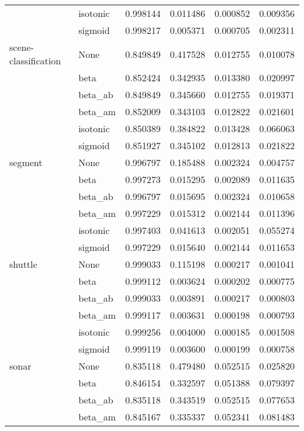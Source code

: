 \begin{tabular}{llrrrr}
        & isotonic &  0.998144 &  0.011486 &  0.000852 &  0.009356 \\
        & sigmoid &  0.998217 &  0.005371 &  0.000705 &  0.002311 \\
scene-classification & None &  0.849849 &  0.417528 &  0.012755 &  0.010078 \\
        & beta &  0.852424 &  0.342935 &  0.013380 &  0.020997 \\
        & beta\_ab &  0.849849 &  0.345660 &  0.012755 &  0.019371 \\
        & beta\_am &  0.852009 &  0.343103 &  0.012822 &  0.021601 \\
        & isotonic &  0.850389 &  0.384822 &  0.013428 &  0.066063 \\
        & sigmoid &  0.851927 &  0.345102 &  0.012813 &  0.021822 \\
segment & None &  0.996797 &  0.185488 &  0.002324 &  0.004757 \\
        & beta &  0.997273 &  0.015295 &  0.002089 &  0.011635 \\
        & beta\_ab &  0.996797 &  0.015695 &  0.002324 &  0.010658 \\
        & beta\_am &  0.997229 &  0.015312 &  0.002144 &  0.011396 \\
        & isotonic &  0.997403 &  0.041613 &  0.002051 &  0.055274 \\
        & sigmoid &  0.997229 &  0.015640 &  0.002144 &  0.011653 \\
shuttle & None &  0.999033 &  0.115198 &  0.000217 &  0.001041 \\
        & beta &  0.999112 &  0.003624 &  0.000202 &  0.000775 \\
        & beta\_ab &  0.999033 &  0.003891 &  0.000217 &  0.000803 \\
        & beta\_am &  0.999117 &  0.003631 &  0.000198 &  0.000793 \\
        & isotonic &  0.999256 &  0.004000 &  0.000185 &  0.001508 \\
        & sigmoid &  0.999119 &  0.003600 &  0.000199 &  0.000758 \\
sonar & None &  0.835118 &  0.479480 &  0.052515 &  0.025820 \\
        & beta &  0.846154 &  0.332597 &  0.051388 &  0.079397 \\
        & beta\_ab &  0.835118 &  0.343519 &  0.052515 &  0.077653 \\
        & beta\_am &  0.845167 &  0.335337 &  0.052341 &  0.081483 \\

\end{tabular}
